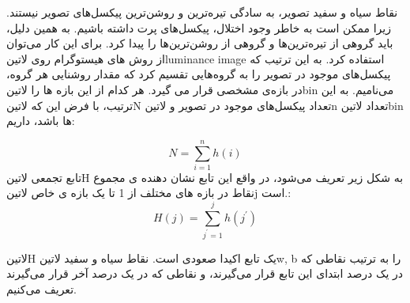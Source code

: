 نقاط سیاه و سفید تصویر، به سادگی تیره‌ترین و روشن‌ترین پیکسل‌های تصویر نیستند. زیرا ممکن است به خاطر وجود اختلال، پیکسل‌های پرت داشته باشیم. به همین دلیل، باید گروهی از تیره‌ترین‌ها و گروهی از روشن‌ترین‌ها را پیدا کرد. 
برای این کار می‌توان از روش های هیستوگرام روی 
‌لاتین{luminance image  }
استفاده کرد. به این ترتیب که پیکسل‌های موجود در تصویر را به گروه‌هایی تقسیم کرد که مقدار روشنایی هر گروه، در بازه‌ی مشخصی قرار می گیرد. هر کدام از این بازه ها را 
 ‌لاتین{bin  }
 می‌نامیم. 
به این ترتیب، با فرض این که 
 ‌لاتین{N}
 تعداد پیکسل‌های موجود در تصویر و 
  ‌لاتین{n  }
  تعداد 
  ‌لاتین{bin  }
  ها باشد، داریم:

\begin{equation}
N = \sum_{i = 1}^{n} h(i)
\end{equation}
تابع تجمعی 
 ‌لاتین{H  }
به شکل زیر تعریف می‌شود، در واقع این تابع نشان دهنده ی مجموع نقاط در بازه های مختلف از 1 تا یک بازه ی خاص 
‌لاتین{j  }
است.:
\begin{equation}
H(j) = \sum_{j^{'} = 1}^{j} h(j^{'})
\end{equation}

‌لاتین{H  }
 یک تابع اکیدا صعودی است. نقاط  سیاه  و سفید 
 ‌لاتین{w, b  }
 را به ترتیب نقاطی که در یک درصد ابتدای این تابع قرار می‌گیرند، و نقاطی که در یک درصد آخر قرار می‌گیرند تعریف می‌کنیم.

